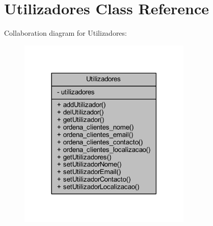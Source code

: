 \hypertarget{class_utilizadores}{}\section{Utilizadores Class Reference}
\label{class_utilizadores}


Collaboration diagram for Utilizadores\+:\nopagebreak
\begin{figure}[H]
\begin{center}
\leavevmode
\includegraphics[width=234pt]{class_utilizadores__coll__graph}
\end{center}
\end{figure}
